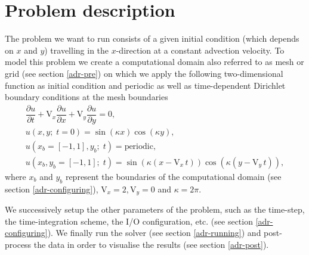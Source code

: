 \section{Problem description}
The problem we want to run consists of a given initial condition (which depends on $x$ and $y$) 
travelling in the $x$-direction at a constant advection velocity. To model this problem we create 
a computational domain also referred to as mesh or grid (see section \ref{adr-pre}) on which we apply 
the following two-dimensional function as initial condition and periodic as well as time-dependent Dirichlet 
boundary conditions at the mesh boundaries
%
\begin{equation}
\begin{array}{l}
\dfrac{\partial u}{\partial t} + \text{V}_{x}\dfrac{\partial u}{\partial x} + \text{V}_{y}\dfrac{\partial u}{\partial y} = 0,\\[1em]
u(x,y;\;t=0) = \sin(\kappa x) \cos(\kappa y),\\[1em]
u(x_{b} = [-1, 1],y_{b};\;t) = \text{periodic},\\[1em]
u(x_{b},y_{b} = [-1, 1];\;t) = \sin(\kappa (x - \text{V}_{x}\,t)) \cos(\kappa (y - \text{V}_{y}\,t)),
\end{array}
\label{eq:advection-2d}
\end{equation}
%
where $x_{b}$ and $y_{b}$ represent the boundaries of the computational domain (see section \ref{adr-configuring}), 
$\text{V}_{x} = 2, \text{V}_{y} = 0$ and $\kappa = 2\pi$.

We successively setup the other parameters of the problem, such as the time-step, the time-integration 
scheme, the I/O configuration, etc. (see section \ref{adr-configuring}). We finally run the solver (see section 
\ref{adr-running}) and post-process the data in order to visualise the results (see section \ref{adr-post}).

